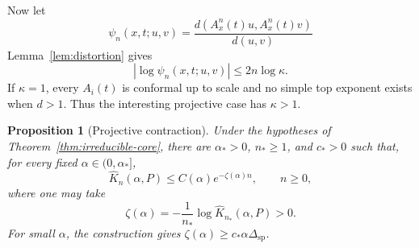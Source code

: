 \documentclass[11pt,a4paper]{amsart}
\newtheorem{proposition}[theorem]{Proposition}
\newcommand{\gap}{\Delta_{\mathrm{sp}}}
\begin{document}
Now let
\[
 \psi_n(x,t;u,v)
 =\frac{d(A_x^n(t)u,A_x^n(t)v)}{d(u,v)}
\]
Lemma~\ref{lem:distortion} gives
\begin{equation}\label{eq:logbound}
 |\log\psi_n(x,t;u,v)|\le2n\log\kappa.
\end{equation}
If \(\kappa=1\), every \(A_i(t)\) is conformal up to scale and no
simple top exponent exists when \(d>1\).  Thus the interesting
projective case has \(\kappa>1\).

\begin{proposition}[Projective contraction]\label{prop:contraction}
Under the hypotheses of Theorem~\ref{thm:irreducible-core}, there are
\(\alpha_*>0\), \(n_*\ge1\), and \(c_*>0\) such that, for every fixed
\(\alpha\in(0,\alpha_*]\),
\[
 \widehat K_n(\alpha,P)
 \le C(\alpha)e^{-\zeta(\alpha)n},
 \qquad n\ge0,
\]
where one may take
\[
 \zeta(\alpha)
 =-\frac1{n_*}\log\widehat K_{n_*}(\alpha,P)>0.
\]
For small \(\alpha\), the construction gives
\(\zeta(\alpha)\ge c_*\alpha\gap\).
\end{proposition}
\end{document}
